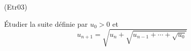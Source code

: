 \begin{tiny}(Etr03)\end{tiny} \'Etudier la suite définie par $u_0>0$ et
\begin{displaymath}
  u_{n+1} = \sqrt{u_n+\sqrt{u_{n-1}+\cdots +\sqrt{u_0}}}
\end{displaymath}
